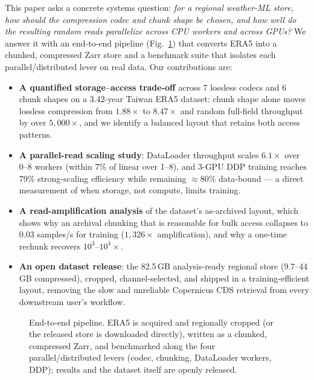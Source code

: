 \documentclass[conference]{IEEEtran}
\begin{document}
This paper asks a concrete systems question: \emph{for a regional weather-ML
store, how should the compression codec and chunk shape be chosen, and how
well do the resulting random reads parallelize across CPU workers and across
GPUs?} We answer it with an end-to-end pipeline (Fig.~\ref{fig:pipeline}) that
converts ERA5 into a chunked, compressed Zarr store and a benchmark suite that
isolates each parallel/distributed lever on real data. Our contributions are:
\begin{itemize}
\item \textbf{A quantified storage--access trade-off} across 7 lossless codecs
  and 6 chunk shapes on a 3.42-year Taiwan ERA5 dataset: chunk shape alone
  moves lossless compression from $1.88\times$ to $8.47\times$ and random
  full-field throughput by over $5{,}000\times$, and we identify a balanced
  layout that retains both access patterns.
\item \textbf{A parallel-read scaling study}: DataLoader throughput scales
  $6.1\times$ over 0--8 workers (within 7\% of linear over 1--8), and 3-GPU
  DDP training reaches 79\% strong-scaling efficiency while remaining
  $\approx$80\% data-bound --- a direct measurement of when storage, not
  compute, limits training.
\item \textbf{A read-amplification analysis} of the dataset's as-archived
  layout, which shows why an archival chunking that is reasonable for bulk
  access collapses to 0.03 samples/s for training ($1{,}326\times$
  amplification), and why a one-time rechunk recovers
  $10^3$--$10^4\times$.
\item \textbf{An open dataset release}: the 82.5\,GB analysis-ready regional
  store (9.7--44\,GB compressed), cropped, channel-selected, and shipped in a
  training-efficient layout, removing the slow and unreliable Copernicus CDS
  retrieval from every downstream user's workflow.
\end{itemize}

\begin{figure}[t]
\centering
{}
\caption{End-to-end pipeline. ERA5 is acquired and regionally cropped (or the
released store is downloaded directly), written as a chunked, compressed Zarr,
and benchmarked along the four parallel/distributed levers (codec, chunking,
DataLoader workers, DDP); results and the dataset itself are openly released.}
\label{fig:pipeline}
\end{figure}
\end{document}
